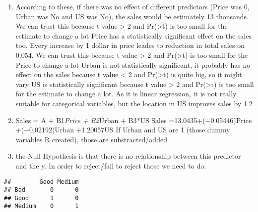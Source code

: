 \documentclass[
]{article}
\newenvironment{Shaded}{\begin{snugshade}}{\end{snugshade}}
\newcommand{\AttributeTok}[1]{\textcolor[rgb]{0.13,0.29,0.53}{#1}}
\newcommand{\FunctionTok}[1]{\textcolor[rgb]{0.13,0.29,0.53}{\textbf{#1}}}
\newcommand{\NormalTok}[1]{#1}
\newcommand{\SpecialCharTok}[1]{\textcolor[rgb]{0.81,0.36,0.00}{\textbf{#1}}}
\begin{document}
\begin{enumerate}
\def\labelenumi{\alph{enumi})}
\setcounter{enumi}{1}
\item
  According to these, if there was no effect of different predictors
  (Price was 0, Urban was No and US was No), the sales would be
  estimately 13 thousands. We can trust this because t value
  \textgreater{} 2 and Pr(\textgreater\textbar t\textbar) is too small
  for the estimate to change a lot Price has a statistically significant
  effect on the sales too. Every increase by 1 dollar in price leades to
  reduction in total sales on 0.054. We can trust this because t value
  \textgreater{} 2 and Pr(\textgreater\textbar t\textbar) is too small
  for the Price to change a lot Urban is not statistically significant,
  it probably has no effect on the sales because t value \textless{} 2
  and Pr(\textgreater\textbar t\textbar) is quite big, so it might vary
  US is statistically significant because t value \textgreater{} 2 and
  Pr(\textgreater\textbar t\textbar) is too small for the estimate to
  change a lot. As it is linear regression, it is not really suitable
  for categorical variables, but the location in US improves sales by
  1.2
\item
  Sales = A + B1\emph{Price + B2}Urban + B3*US Sales
  =13.0435+(−0.05446)Price +(−0.02192)Urban +1.20057US If Urban and US
  are 1 (those dummy variables R created), those are substracted/added
\item
  the Null Hypothesis is that there is no relationship between this
  predictor and the y. In order to reject/fail to reject those we need
  to do:
\end{enumerate}

\begin{Shaded}
\end{Shaded}

\begin{verbatim}
##        Good Medium
## Bad       0      0
## Good      1      0
## Medium    0      1
\end{verbatim}

\begin{Shaded}
\end{Shaded}
\end{document}
